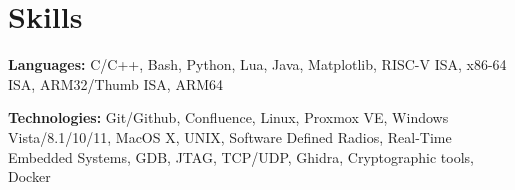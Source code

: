 \documentclass[letterpaper,11pt]{article}
\newcommand{\resumeSubHeadingListStart}{\begin{itemize}[leftmargin=0.15in, label={}]}
\newcommand{\resumeSubHeadingListEnd}{\end{itemize}}
\begin{document}




\section{Skills}
  \vspace{2pt}
  \resumeSubHeadingListStart
    \small{\item{

        \textbf{Languages:}{ C/C++, Bash, Python, Lua, 
        Java, Matplotlib, %
        RISC-V ISA, x86-64 ISA, ARM32/Thumb ISA, ARM64} \\ \vspace{3pt}%


        \textbf{Technologies:}{ Git/Github, Confluence, Linux, Proxmox VE, Windows Vista/8.1/10/11, MacOS X, UNIX, Software Defined Radios,  
                                Real-Time Embedded Systems, GDB, JTAG, TCP/UDP, Ghidra, Cryptographic tools, Docker} \\ \vspace{3pt}

    }}
  \resumeSubHeadingListEnd
\end{document}
